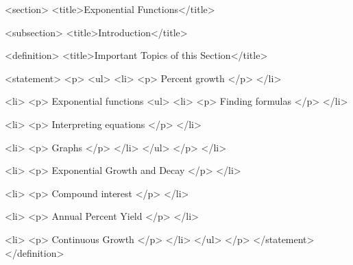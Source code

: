 <section>
    <title>Exponential Functions</title>

    <subsection>
        <title>Introduction</title>

        <definition>
            <title>Important Topics of this Section</title>

            <statement>
                <p>
                    <ul>
                        <li>
                            <p>
                                Percent growth
                            </p>
                        </li>

                        <li>
                            <p>
                                Exponential functions
                                <ul>
                                    <li>
                                        <p>
                                            Finding formulas
                                        </p>
                                    </li>

                                    <li>
                                        <p>
                                            Interpreting equations
                                        </p>
                                    </li>

                                    <li>
                                        <p>
                                            Graphs
                                        </p>
                                    </li>
                                </ul>
                            </p>
                        </li>

                        <li>
                            <p>
                                Exponential Growth and Decay
                            </p>
                        </li>

                        <li>
                            <p>
                                Compound interest
                            </p>
                        </li>

                        <li>
                            <p>
                                Annual Percent Yield
                            </p>
                        </li>

                        <li>
                            <p>
                                Continuous Growth
                            </p>
                        </li>
                    </ul>
                </p>
            </statement>
        </definition>

